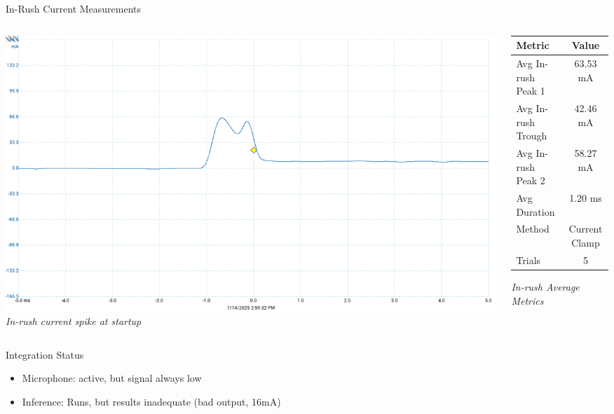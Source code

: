 \begin{frame}{In-Rush Current Measurements}
\begin{columns}

    \begin{column}{0.6\textwidth}
        \centering
        \includegraphics[width=\linewidth]{images/inrush_1core_baseline.png}
        \vspace{0.5em}
        {\small \textit{In-rush current spike at startup}}
    \end{column}

    \begin{column}{0.45\textwidth}
        \centering
        \begin{tabular}{|l|c|}
            \hline
            \textbf{Metric} & \textbf{Value} \\
            \hline
            Avg In-rush Peak 1 & 63.53 mA \\
            Avg In-rush Trough & 42.46 mA \\
            Avg In-rush Peak 2 & 58.27 mA \\
            Avg Duration     & 1.20 ms \\
            Method           & Current Clamp \\
            Trials           & 5 \\
            \hline
        \end{tabular}
        \vspace{0.5em}
        {\small \textit{In-rush Average Metrics}}
    \end{column}
\end{columns}
\end{frame}

\begin{frame}{Integration Status}
    \begin{itemize}
        \item Microphone: active, but signal always low
        \item Inference: Runs, but results inadequate (bad output, 16mA)
    \end{itemize}
\end{frame}

